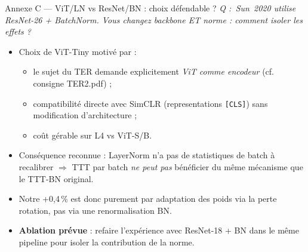 \documentclass[10pt,aspectratio=169]{beamer}
\newcommand{\code}[1]{\texttt{\small #1}}
\newcommand{\qbox}[1]{\textit{\textcolor{accent}{Q : #1}}\par\smallskip}
\begin{document}
\begin{frame}{Annexe C --- ViT/LN vs ResNet/BN : choix défendable ?}
  \qbox{\guillemotleft\,Sun~2020 utilise ResNet-26 + BatchNorm. Vous changez backbone ET norme : comment isoler les effets ?\,\guillemotright{}}

  \begin{itemize}
    \item Choix de ViT-Tiny motivé par :
    \begin{itemize}\small
      \item le sujet du TER demande explicitement \emph{ViT comme encodeur} (cf. consigne TER2.pdf) ;
      \item compatibilité directe avec SimCLR (representations \code{[CLS]}) sans modification d'architecture ;
      \item coût gérable sur L4 vs ViT-S/B.
    \end{itemize}
    \item Conséquence reconnue : LayerNorm n'a pas de statistiques de batch à recalibrer $\Rightarrow$ TTT par batch \emph{ne peut pas} bénéficier du même mécanisme que le TTT-BN original.
    \item Notre +0,4\,\% est donc \alert{purement par adaptation des poids via la perte rotation}, pas via une renormalisation BN.
    \item \textbf{Ablation prévue} : refaire l'expérience avec ResNet-18 + BN dans le même pipeline pour isoler la contribution de la norme.
  \end{itemize}
\end{frame}
\end{document}
